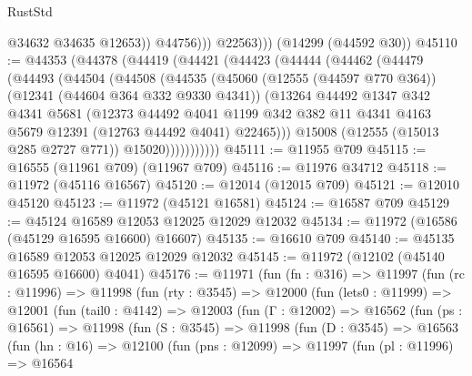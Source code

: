 \begin{lexlean}{RustStd}
\begin{coremodule}
                    @34632
                    @34635
                    @12653))
                @44756)))
          @22563)))
    (@14299 (@44592 @30))
@45110 := @44353
    (@44378
      (@44419
        (@44421
          (@44423
            (@44444
              (@44462
                (@44479
                  (@44493
                    (@44504
                      (@44508
                        (@44535
                          (@45060
                            (@12555 (@44597 @770 @364))
                            (@12341 (@44604 @364 @332 @9330 @4341))
                            (@13264
                              @44492
                              @1347
                              @342
                              @4341
                              @5681
                              (@12373
                                @44492
                                @4041
                                @1199
                                @342
                                @382
                                @11
                                @4341
                                @4163
                                @5679
                                @12391
                                (@12763 @44492 @4041)
                                @22465)))
                          @15008
                          (@12555 (@15013 @285 @2727 @771))
                          @15020)))))))))))
@45111 := @11955 @709
@45115 := @16555 (@11961 @709) (@11967 @709)
@45116 := @11976 @34712
@45118 := @11972 (@45116 @16567)
@45120 := @12014 (@12015 @709)
@45121 := @12010 @45120
@45123 := @11972 (@45121 @16581)
@45124 := @16587 @709
@45129 := @45124 @16589 @12053 @12025 @12029 @12032
@45134 := @11972 (@16586 (@45129 @16595 @16600) @16607)
@45135 := @16610 @709
@45140 := @45135 @16589 @12053 @12025 @12029 @12032
@45145 := @11972 (@12102 (@45140 @16595 @16600) @4041)
@45176 := @11971
    (fun (fn : @316) =>
    @11997
      (fun (rc : @11996) =>
      @11998
        (fun (rty : @3545) =>
        @12000
          (fun (lets0 : @11999) =>
          @12001
            (fun (tail0 : @4142) =>
            @12003
              (fun (Γ : @12002) =>
              @16562
                (fun (ps : @16561) =>
                @11998
                  (fun (S : @3545) =>
                  @11998
                    (fun (D : @3545) =>
                    @16563
                      (fun (hn : @16) =>
                      @12100
                        (fun (pns : @12099) =>
                        @11997
                          (fun (pl : @11996) =>
                          @16564

\end{coremodule}
\end{lexlean}
